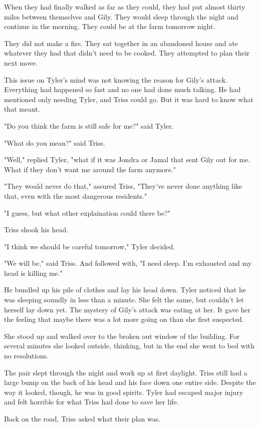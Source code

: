 \documentclass[courier]{sffms}
\begin{document}
When they had finally walked as far as they could,
they had put almost thirty miles between themselves
and Gily. They would sleep through the night and 
continue in the morning. They could be at the farm
tomorrow night.


They did not make a fire. They sat together in an
abandoned house and ate whatever they had that
didn't need to be cooked. They attempted to plan
their next move.

This issue on Tyler's mind was not knowing the reason
for Gily's attack. Everything had happened so fast
and no one had done much talking. He had mentioned
only needing Tyler, and Triss could go. But it was 
hard to know what that meant.

"Do you think the farm is still safe for me?" said Tyler.

"What do you mean?" said Triss.

"Well," replied Tyler, 
"what if it was Jondra or Jamal that sent Gily out for
me. What if they don't want me around the farm
anymore."

"They would never do that," assured Triss, "They've
never done anything like that, even with the most
dangerous residents."

"I guess, but what other explaination could there be?"

Triss shook his head.

"I think we should be careful tomorrow," Tyler decided.

"We will be," said Triss. And followed with, "I need sleep.
I'm exhausted and my head is killing me."

He bundled up his pile of clothes and lay his head down.
Tyler noticed that he was sleeping soundly in less than
a minute. She felt the same, but couldn't let herself lay
down yet. The mystery of Gily's attack was eating at her.
It gave her the feeling that maybe there was a lot more
going on than she first suspected.

She stood up and walked over to the broken out
window of the building. For several minutes she looked
outside, thinking, but in the end she went to bed with
no resolutions.

The pair slept through the night and work up at first
daylight. Triss still had a large bump on the back of his
head and his face down one entire side. Despite the
way it looked, though, he was in good spirits. Tyler
had escaped major injury and felt horrible for what
Triss had done to save her life.

Back on the road, Triss asked what their plan was.
\end{document}
